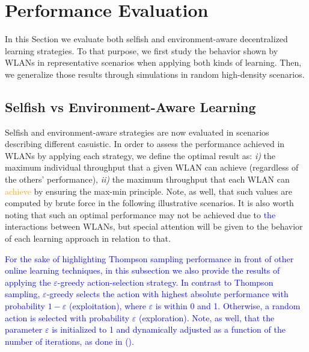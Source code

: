 \documentclass[preprint,12pt]{elsarticle}
\begin{document}
\section{Performance Evaluation}			
\label{section:performance_evaluation}				
In this Section we evaluate both selfish and environment-aware decentralized learning strategies. To that purpose, we first study the 
behavior shown by WLANs in representative scenarios when applying both kinds of learning. Then, we generalize those results through simulations in random high-density scenarios.

\subsection{Selfish vs Environment-Aware Learning}
\label{subsection:selfish_vs_informed}  
Selfish and environment-aware strategies are now evaluated in scenarios describing different casuistic. In order to assess the performance achieved in WLANs by applying each strategy, we define the optimal result as: \emph{i)} the maximum individual throughput that a given WLAN can achieve (regardless of the others' performance), \emph{ii)} the maximum throughput that each WLAN can \textcolor{orange}{achieve} by ensuring the max-min principle. Note, as well, that such values are computed by brute force in the following illustrative scenarios. It is also worth noting that such an optimal performance may not be achieved due to \textcolor{blue}{the} interactions between WLANs, but special attention will be given to the behavior of each learning approach in relation to that.

\textcolor{blue}{For the sake of highlighting Thompson sampling performance in front of other online learning techniques, in this subsection we also provide the results of applying the $\varepsilon$-greedy action-selection strategy. In contrast to Thompson sampling, $\varepsilon$-greedy selects the action with highest absolute performance with probability $1-\varepsilon$ (exploitation), where $\varepsilon$ is within 0 and 1. Otherwise, a random action is selected with probability $\varepsilon$ (exploration). Note, as well, that the parameter $\varepsilon$ is initialized to 1 and dynamically adjusted as a function of the number of iterations, as done in (\citealp{auer2002finite}).}

\end{document}

